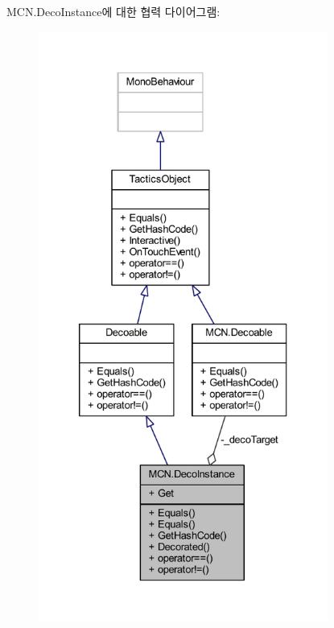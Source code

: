 M\+C\+N.\+Deco\+Instance에 대한 협력 다이어그램\+:\nopagebreak
\begin{figure}[H]
\begin{center}
\leavevmode
\includegraphics[height=550pt]{class_m_c_n_1_1_deco_instance__coll__graph}
\end{center}
\end{figure}
